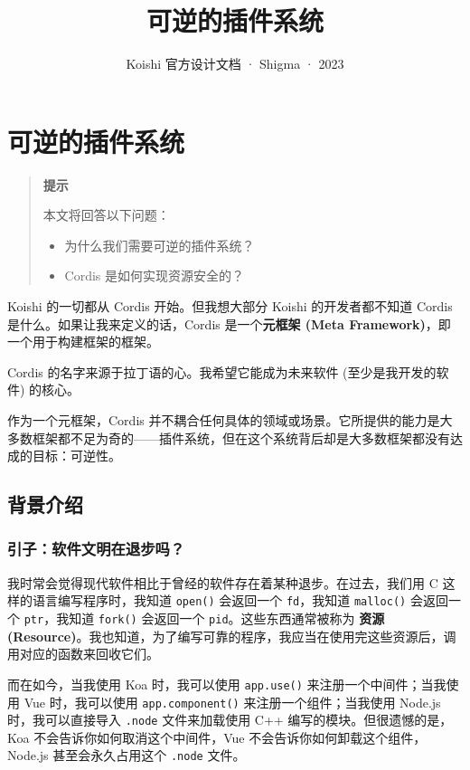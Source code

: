 \documentclass[
  chinese,
  11pt,
]{article}
\title{可逆的插件系统}
\subtitle{Koishi 官方设计文档 · Shigma · 2023}
\author{}
\date{}
\providecommand{\tightlist}{%
  \setlength{\itemsep}{0pt}\setlength{\parskip}{0pt}}
\begin{document}
\maketitle

\section{可逆的插件系统}\label{ux53efux9006ux7684ux63d2ux4ef6ux7cfbux7edf}

\begin{quote}
\textbf{提示}

本文将回答以下问题：

\begin{itemize}
\tightlist
\item
  为什么我们需要可逆的插件系统？
\item
  Cordis 是如何实现资源安全的？
\end{itemize}
\end{quote}

Koishi 的一切都从 Cordis 开始。但我想大部分 Koishi 的开发者都不知道
Cordis 是什么。如果让我来定义的话，Cordis 是一个\textbf{元框架 (Meta
Framework)}，即一个用于构建框架的框架。

Cordis 的名字来源于拉丁语的心。我希望它能成为未来软件
(至少是我开发的软件) 的核心。

作为一个元框架，Cordis
并不耦合任何具体的领域或场景。它所提供的能力是大多数框架都不足为奇的------插件系统，但在这个系统背后却是大多数框架都没有达成的目标：可逆性。

\subsection{背景介绍}\label{ux80ccux666fux4ecbux7ecd}

\subsubsection{引子：软件文明在退步吗？}\label{ux5f15ux5b50ux8f6fux4ef6ux6587ux660eux5728ux9000ux6b65ux5417}

我时常会觉得现代软件相比于曾经的软件存在着某种退步。在过去，我们用 C
这样的语言编写程序时，我知道 \texttt{open()} 会返回一个
\texttt{fd}，我知道 \texttt{malloc()} 会返回一个 \texttt{ptr}，我知道
\texttt{fork()} 会返回一个 \texttt{pid}。这些东西通常被称为 \textbf{资源
(Resource)}。我也知道，为了编写可靠的程序，我应当在使用完这些资源后，调用对应的函数来回收它们。

而在如今，当我使用 Koa 时，我可以使用 \texttt{app.use()}
来注册一个中间件；当我使用 Vue 时，我可以使用 \texttt{app.component()}
来注册一个组件；当我使用 Node.js 时，我可以直接导入 \texttt{.node}
文件来加载使用 C++ 编写的模块。但很遗憾的是，Koa
不会告诉你如何取消这个中间件，Vue 不会告诉你如何卸载这个组件，Node.js
甚至会永久占用这个 \texttt{.node} 文件。
\end{document}
